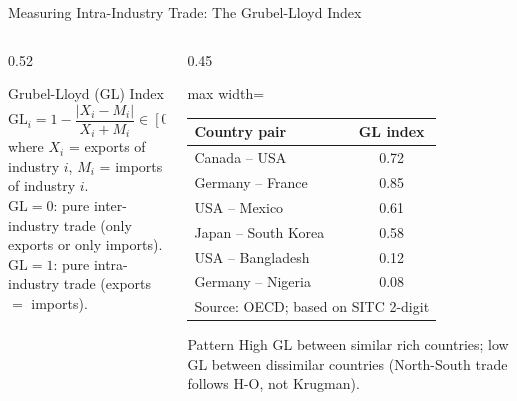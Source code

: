\documentclass[aspectratio=169]{beamer}
\begin{document}
\begin{frame}{Measuring Intra-Industry Trade: The Grubel-Lloyd Index}
\begin{columns}
\begin{column}{0.52\textwidth}
\begin{block}{Grubel-Lloyd (GL) Index}
\[\text{GL}_i = 1 - \frac{|X_i - M_i|}{X_i + M_i} \in [0,1]\]
where $X_i$ = exports of industry $i$, $M_i$ = imports of industry $i$.\\[0.3em]
$\text{GL} = 0$: pure inter-industry trade (only exports or only imports).\\
$\text{GL} = 1$: pure intra-industry trade (exports $=$ imports).
\end{block}
\end{column}
\begin{column}{0.45\textwidth}
\begin{adjustbox}{max width=\columnwidth}
\begin{tabular}{lc}
\toprule
\textbf{Country pair} & \textbf{GL index}\\
\midrule
Canada -- USA & 0.72\\
Germany -- France & 0.85\\
USA -- Mexico & 0.61\\
Japan -- South Korea & 0.58\\
USA -- Bangladesh & 0.12\\
Germany -- Nigeria & 0.08\\
\bottomrule
\multicolumn{2}{l}{\tiny Source: OECD; based on SITC 2-digit}
\end{tabular}
\end{adjustbox}
\begin{insight}{Pattern}
  High GL between similar rich countries; low GL between dissimilar countries (North-South trade follows H-O, not Krugman).
\end{insight}
\end{column}
\end{columns}
\end{frame}
\end{document}
